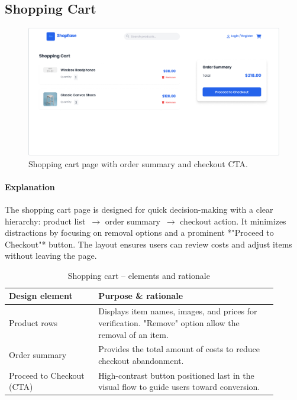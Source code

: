 \documentclass[11pt,a4paper]{article}
\begin{document}
	\subsection{Shopping Cart}\label{subsec:shopping-cart}

	\begin{figure}[H]
		\centering
		\includegraphics[width=\linewidth]{pictures/main/CartPage_Figma}%
		\caption{Shopping cart page with order summary and checkout CTA.}
		\label{fig:ui-cart}
	\end{figure}

	\paragraph{Explanation}%
	The shopping cart page is designed for quick decision-making with a clear hierarchy:
	product list~$\rightarrow$ order summary~$\rightarrow$ checkout action. It minimizes distractions
	by focusing on removal options and a prominent *"Proceed to Checkout"* button.
	The layout ensures users can review costs and adjust items without leaving the page.

	\begin{table}[H]
		\centering
		\caption{Shopping cart – elements and rationale}
		\label{tab:cart-elements}
		\begin{tabular}{p{0.30\linewidth} p{0.60\linewidth}}
			\toprule
			\textbf{Design element} & \textbf{Purpose \& rationale} \\ \midrule
			Product rows            & Displays item names, images, and prices for verification. "Remove" option allow the removal of an item. \\
			Order summary           & Provides the total amount of costs to reduce checkout abandonment. \\
			Proceed to Checkout (CTA) & High-contrast button positioned last in the visual flow to guide users toward conversion. \\
			\bottomrule
		\end{tabular}
	\end{table}
\end{document}
